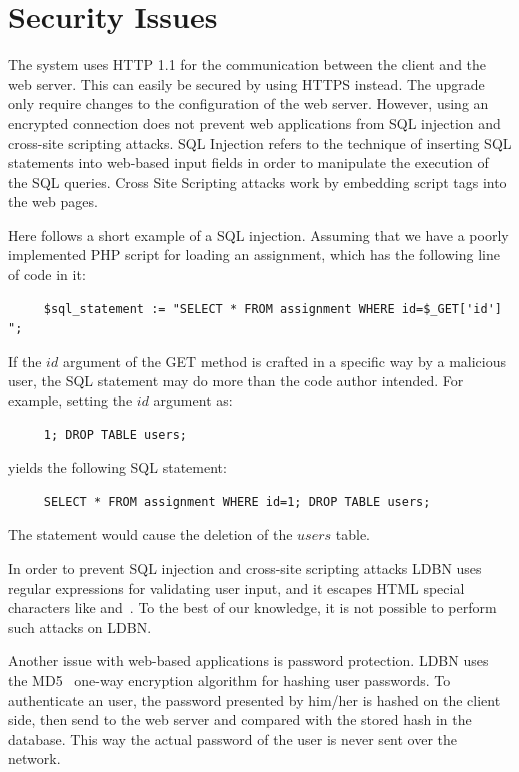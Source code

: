 \section{Security Issues}
The system uses HTTP 1.1 for the communication between the client and the web
server. This can easily be secured by using HTTPS instead. The upgrade only
require changes to the configuration of the web server. However, using an encrypted
connection does not prevent web applications from SQL injection and cross-site 
scripting attacks. SQL Injection refers to the technique of 
inserting SQL statements into web-based input fields in 
order to manipulate the execution of the SQL queries. Cross Site Scripting 
attacks work by embedding script tags into the web pages. 

Here follows a short example of a SQL injection.
Assuming that we have a poorly implemented PHP script for loading an assignment,
which has the following line of code in it:

\begin{verbatim}
     $sql_statement := "SELECT * FROM assignment WHERE id=$_GET['id'] ";
\end{verbatim}

\noindent If the $id$ argument of the GET method is crafted in a specific way by a 
malicious user, the SQL statement may do more than the code author intended. 
For example, setting the $id$ argument as:

\begin{verbatim}
     1; DROP TABLE users;
\end{verbatim}

\noindent yields the following SQL statement:

\begin{verbatim}
     SELECT * FROM assignment WHERE id=1; DROP TABLE users;
\end{verbatim}

\noindent The statement would cause the deletion of the $users$ table. 

In order to prevent SQL injection and cross-site 
scripting attacks LDBN uses regular expressions for validating
user input, and it escapes HTML special characters like \lt and~\gt.
To the best of our knowledge, it is not possible to perform such attacks on LDBN.

Another issue with web-based applications is password protection. LDBN uses the 
MD5~\cite{w7} one-way encryption algorithm for hashing user passwords. 
To authenticate an user, the password presented by him/her is hashed on the client side, 
then send to the web server and compared with the stored hash in the database. 
This way the actual password of the user is never sent over the network.
